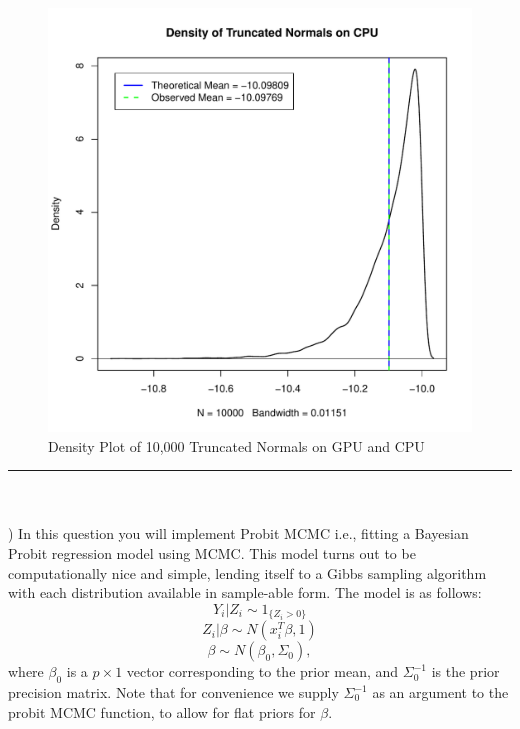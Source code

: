 \documentclass[a4paper, 11pt]{report}
\begin{document}
\begin{enumerate}[a)]
\begin{figure}[H]
					\includegraphics[scale=0.5]{density-1g-cpu.pdf}
					\caption{Density Plot of 10,000 Truncated Normals on GPU and CPU}
					\label{density-1g}
				\end{figure}	
		
			
	\end{enumerate}
	\noindent\rule{\textwidth}{1pt} \\ \\ ) In this question you will implement Probit MCMC i.e., fitting a Bayesian Probit regression model using MCMC. This model turns out to be  computationally nice and simple, lending itself to a Gibbs sampling algorithm with each distribution available in sample-able form. The model is as follows:
	$$ Y_i \vert Z_i \sim 1_{\{Z_i>0\}}$$
	$$ Z_i|\beta \sim N(x_i^T\beta,1)$$
	$$ \beta \sim N(\beta_0,\Sigma_0),$$
	where $\beta_0$ is a $p\times1$ vector corresponding to the prior mean, and $\Sigma_0^{-1}$ is the prior precision matrix. Note that for convenience we supply $\Sigma_0^{-1}$ as an argument to the probit MCMC function, to allow for flat priors for $\beta$.  \\
	
\end{document}
